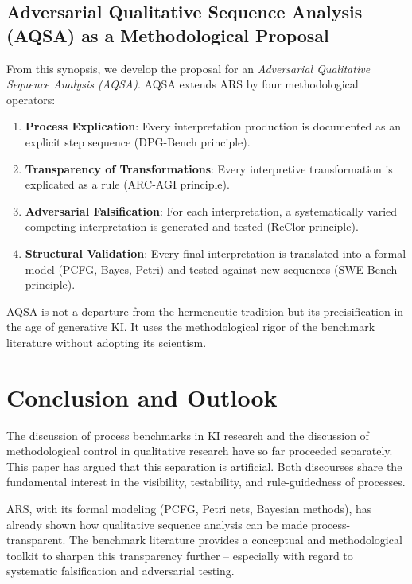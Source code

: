 \documentclass[12pt,a4paper]{article}
\begin{document}
\subsection{Adversarial Qualitative Sequence Analysis (AQSA) as a Methodological Proposal}

From this synopsis, we develop the proposal for an \textit{Adversarial Qualitative Sequence Analysis (AQSA)}. AQSA extends ARS by four methodological operators:

\begin{enumerate}
    \item \textbf{Process Explication}: Every interpretation production is documented as an explicit step sequence (DPG-Bench principle).
    \item \textbf{Transparency of Transformations}: Every interpretive transformation is explicated as a rule (ARC-AGI principle).
    \item \textbf{Adversarial Falsification}: For each interpretation, a systematically varied competing interpretation is generated and tested (ReClor principle).
    \item \textbf{Structural Validation}: Every final interpretation is translated into a formal model (PCFG, Bayes, Petri) and tested against new sequences (SWE-Bench principle).
\end{enumerate}

AQSA is not a departure from the hermeneutic tradition but its precisification in the age of generative KI. It uses the methodological rigor of the benchmark literature without adopting its scientism.

\section{Conclusion and Outlook}

The discussion of process benchmarks in KI research and the discussion of methodological control in qualitative research have so far proceeded separately. This paper has argued that this separation is artificial. Both discourses share the fundamental interest in the visibility, testability, and rule-guidedness of processes.

ARS, with its formal modeling (PCFG, Petri nets, Bayesian methods), has already shown how qualitative sequence analysis can be made process-transparent. The benchmark literature provides a conceptual and methodological toolkit to sharpen this transparency further – especially with regard to systematic falsification and adversarial testing.
\end{document}
